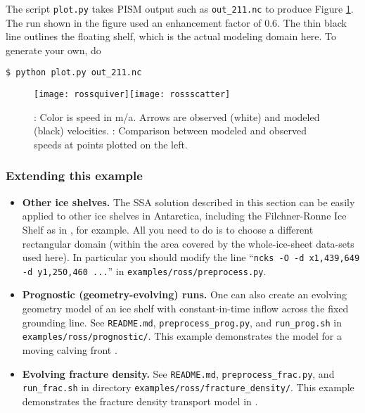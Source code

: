 The script \texttt{plot.py} takes PISM output such as \texttt{out_211.nc} to produce Figure \ref{fig:rosspython}.  The run shown in the figure used an enhancement factor of $0.6$.  The thin black line outlines the floating shelf, which is the actual modeling domain here.  To generate your own, do

\begin{verbatim}
$ python plot.py out_211.nc
\end{verbatim}%

\begin{figure}[ht]
\centering
\mbox{\texttt{[image: rossquiver]}\quad \texttt{[image: rossscatter]}}
\caption{: Color is speed in m/a.  Arrows are observed (white) and modeled (black) velocities.  : Comparison between modeled and observed speeds at points plotted on the left.}
\label{fig:rosspython}
\end{figure}

\subsubsection*{Extending this example}

\begin{itemize}
\item \textbf{Other ice shelves.}  The SSA solution described in this section can be easily applied to other ice shelves in Antarctica, including the Filchner-Ronne Ice Shelf as in \cite{AlbrechtLevermann2012}, for example.  All you need to do is to choose a different rectangular domain (within the area covered by the whole-ice-sheet data-sets used here).  In particular you should modify the line ``\texttt{ncks -O -d x1,439,649 -d y1,250,460 ...}'' in \texttt{examples/ross/preprocess.py}.
\item \textbf{Prognostic (geometry-evolving) runs.}  One can also create an evolving geometry model of an ice shelf with constant-in-time inflow across the fixed grounding line.  See \texttt{README.md}, \texttt{preprocess_prog.py}, and \texttt{run_prog.sh} in \texttt{examples/ross/prognostic/}.  This example demonstrates the  model for a moving calving front \cite{Levermannetal2012}.
\item \textbf{Evolving fracture density.}  See \texttt{README.md}, \texttt{preprocess_frac.py}, and \texttt{run_frac.sh} in directory \texttt{examples/ross/fracture_density/}.  This example demonstrates the fracture density transport model in \cite{AlbrechtLevermann2012}.
\end{itemize}

